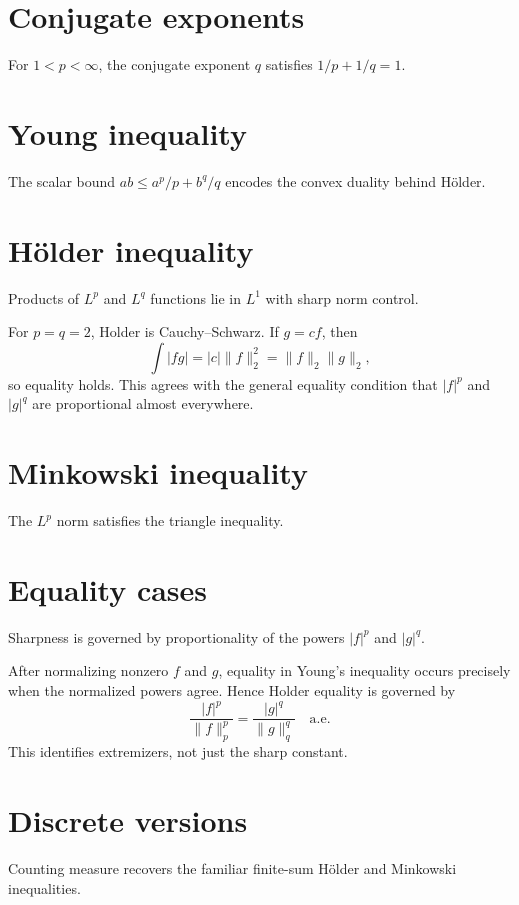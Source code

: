 \section{Conjugate exponents}
For $1<p<\infty$, the conjugate exponent $q$ satisfies $1/p+1/q=1$.

\section{Young inequality}
The scalar bound $ab\le a^p/p+b^q/q$ encodes the convex duality behind Hölder.

\section{Hölder inequality}
Products of $L^p$ and $L^q$ functions lie in $L^1$ with sharp norm control.


\begin{example}\label{ex:iii07-expand-01}
For \(p=q=2\), Holder is Cauchy--Schwarz. If \(g=cf\), then
\[
\int|fg|=|c|\|f\|_2^2=\|f\|_2\|g\|_2,
\]
so equality holds. This agrees with the general equality condition that
\(|f|^p\) and \(|g|^q\) are proportional almost everywhere.
\end{example}
\section{Minkowski inequality}
The $L^p$ norm satisfies the triangle inequality.

\section{Equality cases}
Sharpness is governed by proportionality of the powers $|f|^p$ and $|g|^q$.


\begin{example}\label{ex:iii07-expand-02}
After normalizing nonzero \(f\) and \(g\), equality in Young's inequality
occurs precisely when the normalized powers agree. Hence Holder equality is
governed by
\[
\frac{|f|^p}{\|f\|_p^p}
=
\frac{|g|^q}{\|g\|_q^q}
\quad\text{a.e.}
\]
This identifies extremizers, not just the sharp constant.
\end{example}
\section{Discrete versions}
Counting measure recovers the familiar finite-sum Hölder and Minkowski inequalities.

